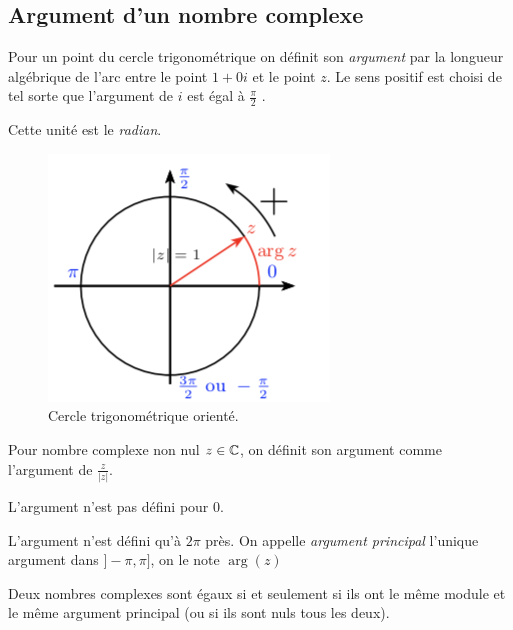 \documentclass[a4paper, 11pt]{article}
\begin{document}
\subsection{Argument d'un nombre complexe}
\begin{defi}
Pour un point du cercle trigonométrique on définit son \emph{argument} par la longueur algébrique de l'arc entre le point $1+0i$  et le point $z$. Le sens positif est choisi de tel sorte que l'argument de $i$ est égal à $\frac{\pi}{2}$ .

Cette unité est le \emph{radian}. 
\end{defi}
\begin{figure}[h]
\centering
\includegraphics[scale=0.8]{images/orient}
\vspace{-0.4cm}
\caption{Cercle trigonométrique orienté.}
\end{figure}


\begin{defi}
Pour nombre complexe non nul $z\in \mathbb{C}$, on définit son argument comme l'argument de $\frac{z}{|z|}$. 
\end{defi}
\begin{remarques}
\item L'argument n'est pas défini pour $0$.  
\item L'argument n'est défini qu'à $2\pi$ près. On appelle \emph{argument principal} l'unique argument dans $]-\pi , \pi]$, on le note 
$\arg(z)$
\item Deux nombres complexes sont égaux si et seulement si ils ont le même module et le même argument principal (ou si ils sont nuls tous les deux). 
\end{remarques}
\end{document}
